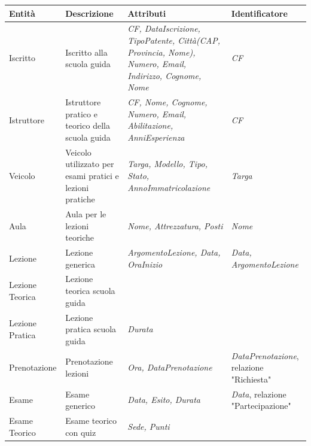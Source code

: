 \documentclass[10pt,twoside]{article}
\begin{document}
{     \begin{table}[H]
        \centering
        \begin{tabularx}{\textwidth}{|>{\centering\arraybackslash}p{2.6cm}|>{\centering\arraybackslash}X|>{\centering\arraybackslash}p{4.85cm}|>{\centering\arraybackslash}X|}
            \hline
            \rowcolor{lightgray!40}
            \textbf{Entità} & \textbf{Descrizione} & \textbf{Attributi} & \textbf{Identificatore} \\
            \hline
            \rowcolor{white!40}
            Iscritto & Iscritto alla scuola guida & \textit{CF, DataIscrizione, TipoPatente, Città(CAP, Provincia, Nome), Numero, Email, Indirizzo, Cognome, Nome} & \textit{CF}\\
            \hline
            \rowcolor{white!40}
            Istruttore & Istruttore pratico e teorico della scuola guida & \textit{CF, Nome, Cognome, Numero, Email, Abilitazione, AnniEsperienza} & \textit{CF} \\
            \hline
            \rowcolor{white!40}
            Veicolo & Veicolo utilizzato per esami pratici e lezioni pratiche & \textit{Targa, Modello, Tipo, Stato, AnnoImmatricolazione} & \textit{Targa}\\
            \hline
            \rowcolor{white!40}
            Aula & Aula per le lezioni teoriche & \textit{Nome, Attrezzatura, Posti} & \textit{Nome}\\
            \hline
            \rowcolor{white!40}
            Lezione & Lezione generica & \textit{ArgomentoLezione, Data, OraInizio} & \textit{Data, ArgomentoLezione}\\
            \hline
            \rowcolor{white!40}
            Lezione Teorica & Lezione teorica scuola guida & & \\
            \hline
            \rowcolor{white!40}
            Lezione Pratica & Lezione pratica scuola guida & \textit{Durata} & \\
            \hline
            \rowcolor{white!40}
            Prenotazione & Prenotazione lezioni & \textit{Ora, DataPrenotazione} & \textit{DataPrenotazione}, relazione "Richiesta"\\
            \hline
            \rowcolor{white!40}
            Esame & Esame generico & \textit{Data, Esito, Durata} & \textit{Data}, relazione "Partecipazione"\\
            \hline
            \rowcolor{white!40}
            Esame Teorico & Esame teorico con quiz & \textit{Sede, Punti} & \\
            \hline

\end{tabularx}
\end{table}}
\end{document}
